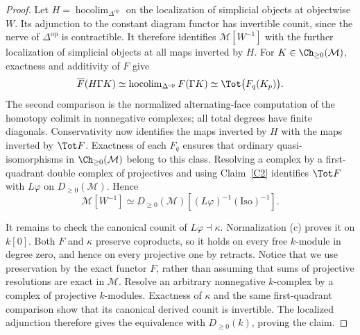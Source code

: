 \begin{proof}
Let $H=\operatorname{hocolim}_{\Delta^{\mathrm{op}}}$ on the localization of simplicial objects at objectwise $W$. Its adjunction to the constant diagram functor has invertible counit, since the nerve of $\Delta^{\mathrm{op}}$ is contractible. It therefore identifies $\mathcal M[W^{-1}]$ with the further localization of simplicial objects at all maps inverted by $H$. For $K\in\Ch_{\geq0}(\mathcal M)$, exactness and additivity of $F$ give
\[
 \overline F(H\Gamma K)
 \simeq\operatorname{hocolim}_{\Delta^{\mathrm{op}}}F(\Gamma K)
 \simeq\Tot\bigl(F_q(K_p)\bigr).
\]
The second comparison is the normalized alternating-face computation of the homotopy colimit in nonnegative complexes; all total degrees have finite diagonals. Conservativity now identifies the maps inverted by $H$ with the maps inverted by $\Tot F$. Exactness of each $F_q$ ensures that ordinary quasi-isomorphisms in $\Ch_{\geq0}(\mathcal M)$ belong to this class. Resolving a complex by a first-quadrant double complex of projectives and using Claim~\ref{C2} identifies $\Tot F$ with $L\varphi$ on $D_{\geq0}(\mathcal M)$. Hence
\[
 \mathcal M[W^{-1}]
 \simeq D_{\geq0}(\mathcal M)
       [(L\varphi)^{-1}(\mathrm{Iso})^{-1}].
\]

It remains to check the canonical counit of $L\varphi\dashv\kappa$. Normalization (c) proves it on $k[0]$. Both $F$ and $\kappa$ preserve coproducts, so it holds on every free $k$-module in degree zero, and hence on every projective one by retracts. Notice that we use preservation by the exact functor $F$, rather than assuming that sums of projective resolutions are exact in $\mathcal M$. Resolve an arbitrary nonnegative $k$-complex by a complex of projective $k$-modules. Exactness of $\kappa$ and the same first-quadrant comparison show that its canonical derived counit is invertible. The localized adjunction therefore gives the equivalence with $D_{\geq0}(k)$, proving the claim.
\end{proof}

